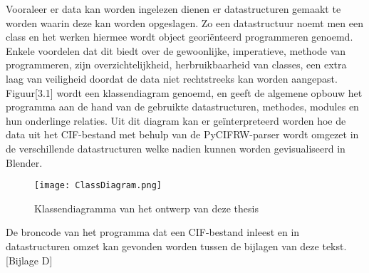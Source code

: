 \par
Vooraleer er data kan worden ingelezen dienen er datastructuren gemaakt te worden waarin deze kan worden opgeslagen. Zo een datastructuur noemt men een class en het werken hiermee wordt object georiënteerd programmeren genoemd. Enkele voordelen dat dit biedt over de gewoonlijke, imperatieve, methode van programmeren, zijn overzichtelijkheid, herbruikbaarheid van classes, een extra laag van veiligheid doordat de data niet rechtstreeks kan worden aangepast. Figuur[3.1] wordt een klassendiagram genoemd, en geeft de algemene opbouw het programma aan de hand van de gebruikte datastructuren, methodes, modules en hun onderlinge relaties. Uit dit diagram kan er geïnterpreteerd worden hoe de data uit het CIF-bestand met behulp van de PyCIFRW-parser wordt omgezet in de verschillende datastructuren welke nadien kunnen worden gevisualiseerd in Blender. 

\begin{figure}[]
\texttt{[image: ClassDiagram.png]}
\caption{Klassendiagramma van het ontwerp van deze thesis}
\end{figure}

\par  
De broncode van het programma dat een CIF-bestand inleest en in datastructuren omzet kan gevonden worden tussen de bijlagen van deze tekst.[Bijlage D]
